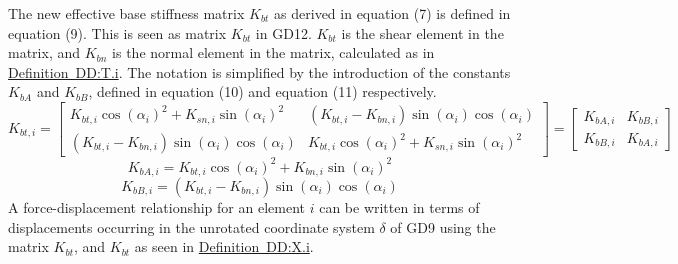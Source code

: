 \documentclass[12pt]{article}
\begin{document}
The new effective base stiffness matrix ${K_{bt}}$ as derived in equation (7) is defined in equation (9). This is seen as matrix ${K_{bt}}$ in GD12. ${K_{bt}}$ is the shear element in the matrix, and ${K_{bn}}$ is the normal element in the matrix, calculated as in \hyperref[DD:T.i]{Definition~DD:T.i}. The notation is simplified by the introduction of the constants ${K_{bA}}$ and ${K_{bB}}$, defined in equation (10) and equation (11) respectively.
\begin{dmath}
{K_{bt,i}}=\begin{bmatrix}
{K_{bt,i}} \cos\left(α_{i}\right)^{2}+{K_{sn,i}} \sin\left(α_{i}\right)^{2} & \left({K_{bt,i}}-{K_{bn,i}}\right) \sin\left(α_{i}\right) \cos\left(α_{i}\right)\\
\left({K_{bt,i}}-{K_{bn,i}}\right) \sin\left(α_{i}\right) \cos\left(α_{i}\right) & {K_{bt,i}} \cos\left(α_{i}\right)^{2}+{K_{sn,i}} \sin\left(α_{i}\right)^{2}
\end{bmatrix}=\begin{bmatrix}
{K_{bA,i}} & {K_{bB,i}}\\
{K_{bB,i}} & {K_{bA,i}}
\end{bmatrix}
\end{dmath}
\begin{dmath}
{K_{bA,i}}={K_{bt,i}} \cos\left(α_{i}\right)^{2}+{K_{bn,i}} \sin\left(α_{i}\right)^{2}
\end{dmath}
\begin{dmath}
{K_{bB,i}}=\left({K_{bt,i}}-{K_{bn,i}}\right) \sin\left(α_{i}\right) \cos\left(α_{i}\right)
\end{dmath}
A force-displacement relationship for an element $i$ can be written in terms of displacements occurring in the unrotated coordinate system $δ$ of GD9 using the matrix ${K_{bt}}$, and ${K_{bt}}$ as seen in \hyperref[DD:X.i]{Definition~DD:X.i}.
~\newline
\end{document}
